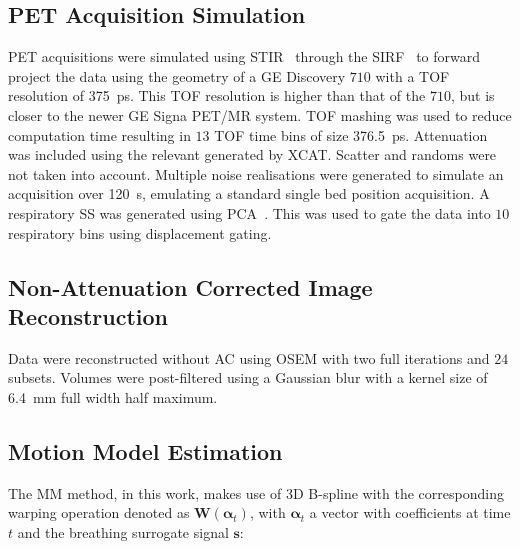     \vspace{-0.5cm}
    
    \subsection{PET Acquisition Simulation} \label{sec:pet_acquisition_simulation}
        \gls{PET} acquisitions were simulated %
        using \gls{STIR}~\cite{Thielemans2012, Efthimiou2018} through the \gls{SIRF}~\cite{Ovtchinnikov2019CCPPETMRSIRF} to forward project the data using the geometry of a \gls{GE} Discovery $710$ with a \gls{TOF} resolution of \SI{375}{\pico\second}. This \gls{TOF} resolution is higher than that of the $710$, but is closer to the newer \gls{GE} Signa \gls{PET}/MR system. \gls{TOF} mashing was used to reduce computation time resulting in $13$ \gls{TOF} time bins of size \SI{376.5}{\pico\second}. Attenuation was included using the relevant  generated by \gls{XCAT}. Scatter and randoms were not taken into account. Multiple noise realisations were generated to simulate an acquisition over \SI{120}{\second}, emulating a standard single bed position acquisition. A respiratory \gls{SS} was generated using \gls{PCA}~\cite{Thielemans2011}. This was used to gate the data into $10$ respiratory bins using displacement gating.%
    
    \vspace{-0.5cm}
    
    \subsection{Non-Attenuation Corrected Image Reconstruction} \label{sec:non-attenuation_corrected_image_reconstruction}
        Data were reconstructed without \gls{AC} using OSEM with two full iterations and $24$ subsets.%
        Volumes were post-filtered using a Gaussian blur with a kernel size of \SI{6.4}{\milli\metre} full width half maximum.
    
    \vspace{-0.5cm}
    
    \subsection{Motion Model Estimation} \label{sec:motion_model_estimation}
        The \gls{MM} method, in this work, makes use of \gls{3D} B-spline  with the corresponding warping operation denoted as $\mathbf{W}(\mathbf{\alpha}_t)$, with $\mathbf{\alpha}_t$ a vector with coefficients at time $t$ and the breathing surrogate signal $\mathbf{s}$:
    
